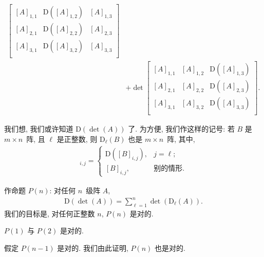 \documentclass[../libro.tex]{subfiles}
\begin{document}
\begin{example}
\begin{align*}
{\begin{bmatrix}
                [A]_{1,1} & \mathrm{D} ([A]_{1,2}) & [A]_{1,3} \\
                [A]_{2,1} & \mathrm{D} ([A]_{2,2}) & [A]_{2,3} \\
                [A]_{3,1} & \mathrm{D} ([A]_{3,2}) & [A]_{3,3} \\
        \end{bmatrix}}
        \\
        &
        + \det {
            \begin{bmatrix}
                [A]_{1,1} & [A]_{1,2} & \mathrm{D} ([A]_{1,3}) \\
                [A]_{2,1} & [A]_{2,2} & \mathrm{D} ([A]_{2,3}) \\
                [A]_{3,1} & [A]_{3,2} & \mathrm{D} ([A]_{3,3}) \\
        \end{bmatrix}}.
    \end{align*}

    我们想, 我们或许知道 \(\mathrm{D} (\det {(A)})\) 了.
    为方便, 我们作这样的记号:
    若 \(B\) 是 \(m \times n\)~阵,
    且 \(\ell\) 是正整数,
    则 \(\mathrm{D}_\ell (B)\) 也是 \(m \times n\)~阵,
    其中,
    \begin{align*}
        [\mathrm{D}_\ell (B)]_{i,j} =
        \begin{cases}
            \mathrm{D} ([B]_{i,j}), & j = \ell;    \\
            [B]_{i,j},              & \text{别的情形}.
        \end{cases}
    \end{align*}

    作命题 \(P(n)\):
    对任何 \(n\)~级阵 \(A\),
    \begin{align*}
        \mathrm{D} (\det {(A)})
        = \sum_{\ell = 1}^{n} {\det {(\mathrm{D}_\ell (A))}}.
    \end{align*}
    我们的目标是,
    对任何正整数 \(n\), \(P(n)\) 是对的.

    \(P(1)\) 与 \(P(2)\) 是对的.

    假定 \(P(n-1)\) 是对的.
    我们由此证明, \(P(n)\) 也是对的.


\end{example}
\end{document}
